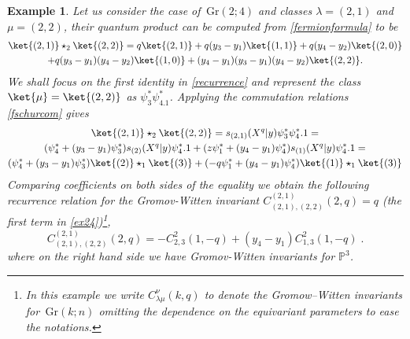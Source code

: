 \documentclass[12pt]{amsart}
\newcommand{\Gr}{\,\mathrm{Gr}}
\newtheorem{example}[prop]{Example}
\numberwithin{equation}{section}
\numberwithin{figure}{section}
\begin{document}
    \begin{example}\rm
        Let us consider the case of $\Gr(2;4)$ and classes $\lambda=(2,1)$ and $\mu = (2,2)$, their quantum product can be computed from \eqref{fermionformula} to be
        \begin{multline}\label{ex24}
        \ket{(2,1)} \star_2 \ket{(2,2)} = q \ket{(2,1)} + q (y_3 - y_1) \ket{(1,1)} + q (y_4 - y_2) \ket{(2,0)} \\ + q(y_3 - y_1)(y_4 - y_2) \ket{(1,0)} + (y_4 - y_1)(y_3 - y_1) (y_4 - y_2) \ket{(2,2)}.
        \end{multline}
        We shall focus on the first identity in \eqref{recurrence} and  represent the class $\ket{\mu} = \ket{(2,2)}$ as $\psi^*_3 \psi^*_4.1$. Applying the commutation relations \eqref{fschurcom} gives
        \begin{multline*}
        \ket{(2,1)}\star_2\ket{(2,2)}=s_{(2,1)}(X^q | y) \psi^*_3 \psi^*_4.1 = \\
        (\psi^*_4 + (y_3 - y_1)\psi^*_3) s_{(2)}(X^q | y) \psi^*_4 .1 + (z \psi^*_1 +(y_4 - y_1) \psi^*_4)s_{(1)}(X^q | y) \psi^*_4 .1=\\
        (\psi^*_4 + (y_3 - y_1)\psi^*_3)\ket{(2)}\star_1\ket{(3)}
        +(-q \psi^*_1 +(y_4 - y_1) \psi^*_4)\ket{(1)}\star_1\ket{(3)}
        \end{multline*}
        Comparing coefficients on both sides of the equality we obtain the following recurrence relation for the Gromov-Witten invariant $C_{(2,1),(2,2)}^{(2,1)}(2, q) = q $ (the first term in \eqref{ex24})\footnote{In this example we write $C^{\nu}_{\lambda\mu}(k,q)$ to denote the Gromow--Witten invariants for $\Gr(k;n)$ omitting the dependence on the equivariant parameters to ease the notations.},
        \[
        C_{(2,1),(2,2)}^{(2,1)}(2,q) = -C_{2,3}^2(1, -q) + (y_4 - y_1) C_{1,3}^{2}(1, -q)\;.
        \]
        where on the right hand side we have Gromov-Witten invariants for $\mathbb{P}^3$. 
        

\end{example}
\end{document}

